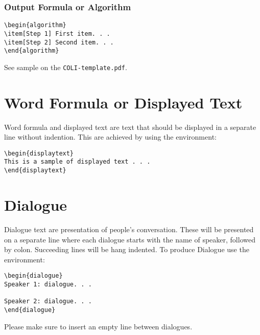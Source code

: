 \documentclass{clv3}
\begin{document}
\subsubsection{Output Formula or Algorithm}

\begin{verbatim}
\begin{algorithm}
\item[Step 1] First item. . .
\item[Step 2] Second item. . .
\end{algorithm}
\end{verbatim}


See sample on the {\tt COLI-template.pdf}.

\section{Word Formula or Displayed Text}

Word formula and displayed text are text that should be displayed in a
separate line without indention. This are achieved by using the environment:

\begin{verbatim}
\begin{displaytext}
This is a sample of displayed text . . .
\end{displaytext}
\end{verbatim}

\section{Dialogue}

Dialogue text are presentation of people's conversation. These will be presented
on a separate line where each dialogue starts with the name of speaker, followed by
colon. Succeeding lines will be hang indented. To produce Dialogue use the environment:
\\
\begin{verbatim}
\begin{dialogue}
Speaker 1: dialogue. . .

Speaker 2: dialogue. . .
\end{dialogue}
\end{verbatim}


\noindent Please make sure to insert an empty line between dialogues.
\end{document}
